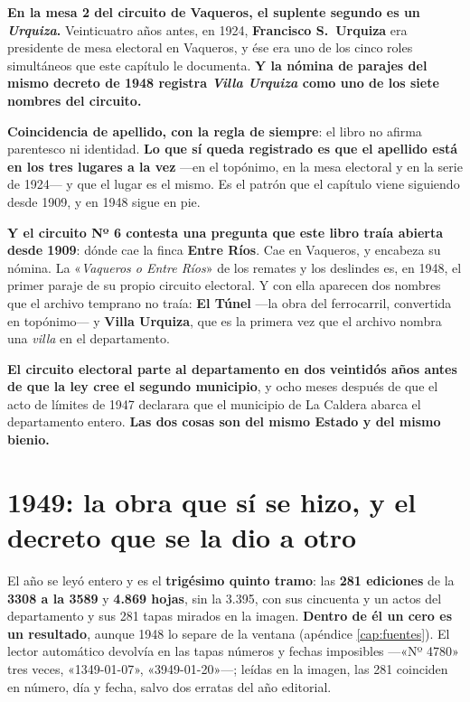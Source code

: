\begin{cautela}
\begin{cautela}
\textbf{En la mesa 2 del circuito de Vaqueros, el suplente segundo es un \textit{Urquiza}.}
Veinticuatro años antes, en 1924, \textbf{Francisco S.\ Urquiza} era presidente de mesa
electoral en Vaqueros, y ése era uno de los cinco roles simultáneos que este capítulo le
documenta. \textbf{Y la nómina de parajes del mismo decreto de 1948 registra \textit{Villa
Urquiza} como uno de los siete nombres del circuito.}

\textbf{Coincidencia de apellido, con la regla de siempre}: el libro no afirma parentesco ni
identidad. \textbf{Lo que sí queda registrado es que el apellido está en los tres lugares a la
vez} ---en el topónimo, en la mesa electoral y en la serie de 1924--- y que el lugar es el
mismo. Es el patrón que el capítulo viene siguiendo desde 1909, y en 1948 sigue en pie.
\end{cautela}

\textbf{Y el circuito Nº 6 contesta una pregunta que este libro traía abierta desde 1909}:
dónde cae la finca \textbf{Entre Ríos}. Cae en Vaqueros, y encabeza su nómina. La
«\textit{Vaqueros o Entre Ríos}» de los remates y los deslindes es, en 1948, el primer
paraje de su propio circuito electoral. Y con ella aparecen dos nombres que el archivo
temprano no traía: \textbf{El Túnel} ---la obra del ferrocarril, convertida en topónimo--- y
\textbf{Villa Urquiza}, que es la primera vez que el archivo nombra una \textit{villa} en el
departamento.

\textbf{El circuito electoral parte al departamento en dos
veintidós años antes de que la ley cree el segundo municipio}, y ocho meses después de que el
acto de límites de 1947 declarara que el municipio de La Caldera abarca el departamento
entero. \textbf{Las dos cosas son del mismo Estado y del mismo bienio.}
\end{cautela}


\section{1949: la obra que sí se hizo, y el decreto que se la dio a otro}

El año se leyó entero y es el \textbf{trigésimo quinto tramo}: las \textbf{281 ediciones} de la
\textbf{3308 a la 3589} y \textbf{4.869 hojas}, sin la 3.395, con sus cincuenta y un actos del
departamento y sus 281 tapas mirados en la imagen. \textbf{Dentro de él un cero es un resultado},
aunque 1948 lo separe de la ventana (apéndice \ref{cap:fuentes}). El lector automático devolvía en
las tapas números y fechas imposibles ---«Nº 4780» tres veces, «1349-01-07», «3949-01-20»---; leídas en
la imagen, las 281 coinciden en número, día y fecha, salvo dos erratas del año editorial.

